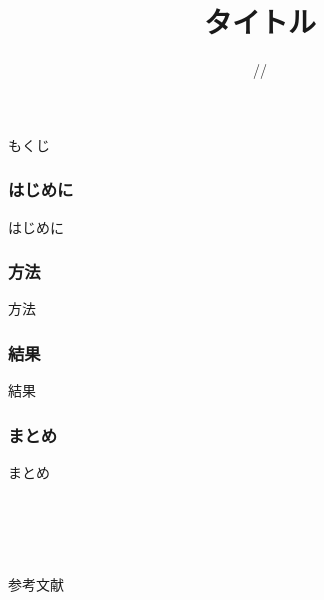 \documentclass[aspectratio=169,dvipdfmx]{beamer}
\title{タイトル}
\author{\myname}
\date{\the\year/\the\month/\the\day}
\institute[\myorgshort]{\myorg}
\begin{document}
\begingroup

    \maketitle
\endgroup


\begin{frame}[plain]{もくじ}
    \tableofcontents[hideallsubsections]
\end{frame}

\section{はじめに}
\begin{frame}{はじめに}

\end{frame}

\section{方法}
\begin{frame}{方法}

\end{frame}

\section{結果}
\begin{frame}{結果}

\end{frame}

\section{まとめ}
\begin{frame}{まとめ}

\end{frame}

\part*{}
\begingroup
    \begin{frame}
        \begin{center}
            {\bf \myname}\\
            {\scriptsize \mymail}\\
        \end{center}
    \end{frame}

    \begin{frame}[plain]{参考文献}
        \nocite{*}
        \printbibliography
    \end{frame}
\endgroup
\end{document}
